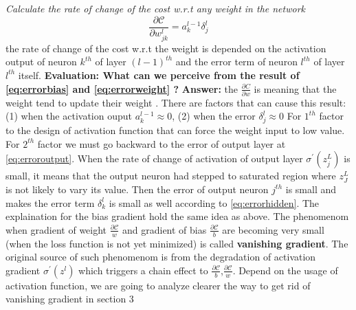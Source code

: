 \vspace{1.5cm}\noindent
\textit{Calculate the rate of change of the cost w.r.t any weight in the network}
\begin{equation}\label{eq:errorweight}
    \frac{\partial \mathcal{C}}{\partial w^{l}_{jk}} = a^{l-1}_{k} \delta^{l}_{j}
\end{equation}
the rate of change of the cost w.r.t the weight is depended on the activation output of neuron $k^{th}$ of layer $(l-1)^{th}$ and the error term of neuron $l^{th}$ of layer $l^{th}$ itself.\newline\noindent
\newline\noindent
\textbf{Evaluation: What can we perceive from the result of \eqref{eq:errorbias} and \eqref{eq:errorweight} ?}\newline\noindent
\textbf{Answer:} the $\frac{\partial C}{\partial w}$ is \underline{} meaning that the weight tend to update their weight \underline{}. There are factors that can cause this result: (1) when the activation ouput $a^{l-1}_{k} \approx 0$, (2) when the error $\delta^{l}_{j} \approx 0$\newline \noindent
For $1^{th}$ factor to the design of activation function that can force the weight input to low value.\newline\noindent
For $2^{th}$ factor we must go backward to the error of output layer at \eqref{eq:erroroutput}. When the rate of change of activation of output layer $\sigma^{'}(z^{L}_{j})$ is small, it means that the output neuron had stepped to saturated region where $z^{L}_{J}$ is not likely to vary its value. Then the error of output neuron $j^{th}$ is small and makes the error term $\delta^{l}_{k}$ is small as well according to \eqref{eq:errorhidden}.\newline \noindent
The explaination for the bias gradient hold the same idea as above. The phenomenom when gradient of weight $\frac{\partial \mathcal{C}}{w}$ and gradient of bias $\frac{\partial \mathcal{C}}{b}$ are becoming very small \underline{} (when the loss function is not yet minimized) is called \textbf{vanishing gradient}. The original source of such phenomenom is from the degradation of activation gradient $\sigma^{'}(z^{l})$ which triggers a chain effect to $\frac{\partial \mathcal{C}}{b}$,$\frac{\partial \mathcal{C}}{w}$. Depend on the usage of activation function, we are going to analyze clearer the way to get rid of vanishing gradient in section 3\newline\noindent
\newline\noindent
